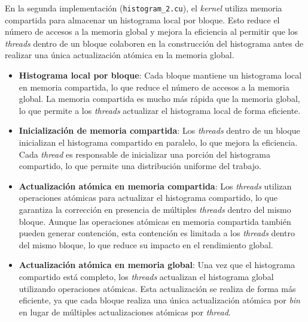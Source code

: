             En la segunda implementación (\texttt{histogram\_2.cu}), el \textit{kernel} utiliza memoria compartida para almacenar un histograma local por bloque. Esto reduce el número de accesos a la memoria global y mejora la eficiencia al permitir que los \textit{threads} dentro de un bloque colaboren en la construcción del histograma antes de realizar una única actualización atómica en la memoria global.
        
            \begin{itemize}
            
                \item \textbf{Histograma local por bloque}: Cada bloque mantiene un histograma local en memoria compartida, lo que reduce el número de accesos a la memoria global. La memoria compartida es mucho más rápida que la memoria global, lo que permite a los \textit{threads} actualizar el histograma local de forma eficiente.
                
                \item \textbf{Inicialización de memoria compartida}: Los \textit{threads} dentro de un bloque inicializan el histograma compartido en paralelo, lo que mejora la eficiencia. Cada \textit{thread} es responsable de inicializar una porción del histograma compartido, lo que permite una distribución uniforme del trabajo.
                
                \item \textbf{Actualización atómica en memoria compartida}: Los \textit{threads} utilizan operaciones atómicas para actualizar el histograma compartido, lo que garantiza la corrección en presencia de múltiples \textit{threads} dentro del mismo bloque. Aunque las operaciones atómicas en memoria compartida también pueden generar contención, esta contención es limitada a los \textit{threads} dentro del mismo bloque, lo que reduce su impacto en el rendimiento global.
                
                \item \textbf{Actualización atómica en memoria global}: Una vez que el histograma compartido está completo, los \textit{threads} actualizan el histograma global utilizando operaciones atómicas. Esta actualización se realiza de forma más eficiente, ya que cada bloque realiza una única actualización atómica por \textit{bin} en lugar de múltiples actualizaciones atómicas por \textit{thread}.
                
            \end{itemize}
            
